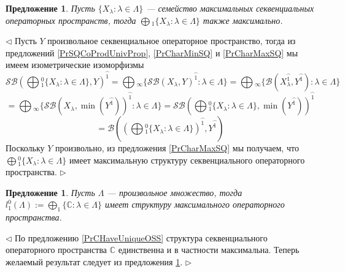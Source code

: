 \documentclass[12pt]{article}
\newtheorem{proposition}[theorem]{Предложение}
\newenvironment{proof}{\par $\triangleleft$}{$\triangleright$}
\begin{document}
\begin{proposition}\label{PrMaxCommuteWithCoprod} Пусть $\{X_\lambda:\lambda\in\Lambda\}$ --- семейство максимальных секвенциальных операторных пространств, тогда $\bigoplus{}_1\{X_\lambda:\lambda\in\Lambda\}$ также максимально.
\end{proposition} 
\begin{proof}
Пусть $Y$ произвольное секвенциальное операторное пространство, тогда из предложений \ref{PrSQCoProdUnivProp}, \ref{PrCharMinSQ} и \ref{PrCharMaxSQ} мы имеем изометрические изоморфизмы
$$
\mathcal{SB}\left(\bigoplus{}_1^0\{X_\lambda:\lambda\in\Lambda\},Y\right)^{\wideparen{1}}
=\bigoplus{}_\infty\{\mathcal{SB}(X_\lambda,Y)^{\wideparen{1}}:\lambda\in\Lambda\}
=\bigoplus{}_\infty\{\mathcal{B}(X_\lambda^{\wideparen{1}},Y^{\wideparen{1}}):\lambda\in\Lambda\}
$$
$$
=\bigoplus{}_\infty\{\mathcal{SB}(X_\lambda,\min(Y^{\wideparen{1}}))^{\wideparen{1}}:\lambda\in\Lambda\}
=\mathcal{SB}\left(\bigoplus{}_1^0\{X_\lambda:\lambda\in\Lambda\},\min(Y^{\wideparen{1}})\right)^{\wideparen{1}}
$$
$$
=\mathcal{B}\left(\left(\bigoplus{}_1^0\{X_\lambda:\lambda\in\Lambda\}\right)^{\wideparen{1}},Y^{\wideparen{1}}\right)
$$
Поскольку $Y$ произвольно, из предложения \ref{PrCharMaxSQ} мы получаем, что $\bigoplus{}_1^0\{X_\lambda:\lambda\in\Lambda\}$ имеет максимальную структуру секвенциального операторного пространства.
\end{proof}

\begin{proposition}\label{Prl1IsMax} Пусть $\Lambda$ --- произвольное множество, тогда $l_1^0(\Lambda):=\bigoplus_1\{\mathbb{C}:\lambda\in\Lambda\}$ имеет структуру максимального операторного пространства.
\end{proposition}
\begin{proof} По предложению \ref{PrCHaveUniqueOSS} структура секвенциального операторного пространства $\mathbb{C}$ единственна и в частности максимальна. Теперь желаемый результат следует из предложения \ref{PrMaxCommuteWithCoprod}.
\end{proof}
\end{document}
